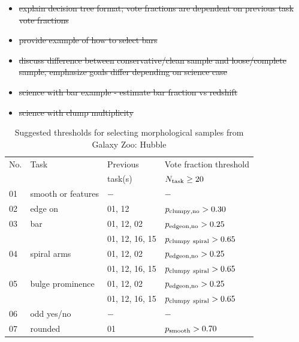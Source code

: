 \documentclass[twocolumn]{aastex6}
\begin{document}
{\note
\begin{itemize}
    \item \sout{explain decision tree format; vote fractions are dependent on previous task vote fractions} 
    \item \sout{provide example of how to select bars}
    \item \sout{discuss difference between conservative/clean sample and loose/complete sample, emphasize goals differ depending on science case}
    \item \sout{science with bar example - estimate bar fraction vs redshift}
    \item \sout{science with clump multiplicity }
\end{itemize}
} 
\begin{table}
\caption{Suggested thresholds for selecting morphological samples from Galaxy Zoo: Hubble \label{tbl:thresholds}}
\begin{tabular}{llll}
\hline\hline
No.      &  Task 	            & Previous              & Vote fraction threshold            \\
         &            	        & task(s)               & $N_{\rm task} \ge 20$              \\
\hline
01       & smooth or features   & $-$                   & $-$                                \\
02       & edge on              & 01, 12                & $p_{\rm clumpy,no}>0.30$            \\
03       & bar		            & 01, 12, 02            & $p_{\rm edgeon,no}>0.25$           \\
         &                      & 01, 12, 16, 15        & $p_{\rm clumpy~spiral}>0.65$  \\
04       & spiral arms          & 01, 12, 02            & $p_{\rm edgeon,no}>0.25$           \\
         &                      & 01, 12, 16, 15        & $p_{\rm clumpy~spiral}>0.65$  \\
05       & bulge prominence     & 01, 12, 02            & $p_{\rm edgeon,no}>0.25$           \\
         &                      & 01, 12, 16, 15        & $p_{\rm clumpy~spiral}>0.65$  \\
06       & odd yes/no           & $-$                   & $-$                                \\
07       & rounded              & 01                    & $p_{\rm smooth}>0.70$               \\

\end{tabular}
\end{table}
\end{document}
